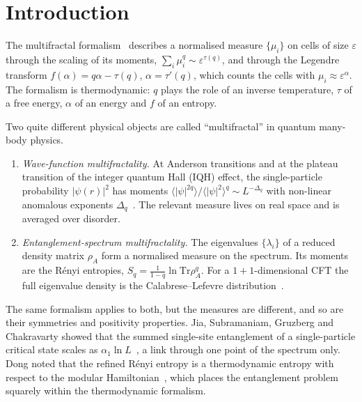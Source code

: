 \documentclass[11pt]{article}
\theoremstyle{definition}\newtheorem{definition}{Definition}[section]
\theoremstyle{remark}\newtheorem*{remark}{Remark}
\newcommand{\Tr}{\mathrm{Tr}}
\begin{document}
\tableofcontents

\section{Introduction}
\label{sec:intro}

The multifractal formalism~\cite{Halsey,BeckSchlogl} describes a normalised measure $\{\mu_i\}$ on cells of
size $\varepsilon$ through the scaling of its moments, $\sum_i\mu_i^q\sim\varepsilon^{\tau(q)}$, and through
the Legendre transform $f(\alpha)=q\alpha-\tau(q)$, $\alpha=\tau'(q)$, which counts the cells with
$\mu_i\approx\varepsilon^{\alpha}$. The formalism is thermodynamic: $q$ plays the role of an inverse
temperature, $\tau$ of a free energy, $\alpha$ of an energy and $f$ of an entropy.

Two quite different physical objects are called ``multifractal'' in quantum many-body physics.
\begin{enumerate}
\item \emph{Wave-function multifractality.} At Anderson transitions and at the plateau transition of the
integer quantum Hall (IQH) effect, the single-particle probability $|\psi(r)|^2$ has moments
$\langle|\psi|^{2q}\rangle/\langle|\psi|^2\rangle^q\sim L^{-\Delta_q}$ with non-linear anomalous exponents
$\Delta_q$~\cite{EversMirlin}. The relevant measure lives on real space and is averaged over disorder.
\item \emph{Entanglement-spectrum multifractality.} The eigenvalues $\{\lambda_i\}$ of a reduced density
matrix $\rho_A$ form a normalised measure on the spectrum. Its moments are the R\'enyi entropies,
$S_q=\frac{1}{1-q}\ln\Tr\rho_A^q$. For a $1+1$-dimensional CFT the full eigenvalue density is the
Calabrese--Lefevre distribution~\cite{CL}.
\end{enumerate}
The same formalism applies to both, but the measures are different, and so are their symmetries and
positivity properties. Jia, Subramaniam, Gruzberg and Chakravarty showed that the summed single-site
entanglement of a single-particle critical state scales as $\alpha_1\ln L$~\cite{Jia}, a link through one
point of the spectrum only. Dong noted that the refined R\'enyi entropy is a thermodynamic entropy with respect
to the modular Hamiltonian~\cite{Dong}, which places the entanglement problem squarely within the
thermodynamic formalism.
\end{document}
